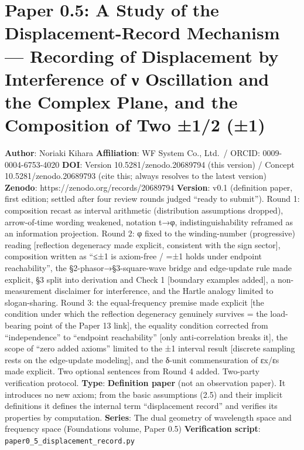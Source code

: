 \documentclass[
]{ltjsarticle}
\author{}
\date{}
\begin{document}
\section{Paper 0.5: A Study of the Displacement-Record Mechanism ---
Recording of Displacement by Interference of ν Oscillation and the
Complex Plane, and the Composition of Two ±1/2
(±1)}\label{paper-0.5-a-study-of-the-displacement-record-mechanism-recording-of-displacement-by-interference-of-ux3bd-oscillation-and-the-complex-plane-and-the-composition-of-two-12-1}

\textbf{Author}: Noriaki Kihara \textbf{Affiliation}: WF System Co.,
Ltd.~/ ORCID: 0009-0004-6753-4020 \textbf{DOI}: Version
10.5281/zenodo.20689794 (this version) / Concept 10.5281/zenodo.20689793
(cite this; always resolves to the latest version) \textbf{Zenodo}:
https://zenodo.org/records/20689794 \textbf{Version}: v0.1 (definition
paper, first edition; settled after four review rounds judged ``ready to
submit''). Round 1: composition recast as interval arithmetic
(distribution assumptions dropped), arrow-of-time wording weakened,
notation t→φ, indistinguishability reframed as an information
projection. Round 2: φ fixed to the winding-number (progressive) reading
{[}reflection degeneracy made explicit, consistent with the sign
sector{]}, composition written as ``≤±1 is axiom-free / =±1 holds under
endpoint reachability'', the §2-phasor→§3-square-wave bridge and
edge-update rule made explicit, §3 split into derivation and Check 1
{[}boundary examples added{]}, a non-measurement disclaimer for
interference, and the Hartle analogy limited to slogan-sharing. Round 3:
the equal-frequency premise made explicit {[}the condition under which
the reflection degeneracy genuinely survives = the load-bearing point of
the Paper 13 link{]}, the equality condition corrected from
``independence'' to ``endpoint reachability'' {[}only anti-correlation
breaks it{]}, the scope of ``zero added axioms'' limited to the ±1
interval result {[}discrete sampling rests on the edge-update
modeling{]}, and the δ-unit commensuration of εx/εs made explicit. Two
optional sentences from Round 4 added. Two-party verification protocol.
\textbf{Type}: \textbf{Definition paper} (not an observation paper). It
introduces no new axiom; from the basic assumptions (2.5) and their
implicit definitions it defines the internal term ``displacement
record'' and verifies its properties by computation. \textbf{Series}:
The dual geometry of wavelength space and frequency space (Foundations
volume, Paper 0.5) \textbf{Verification script}:
\texttt{paper0\_5\_displacement\_record.py}
\end{document}

